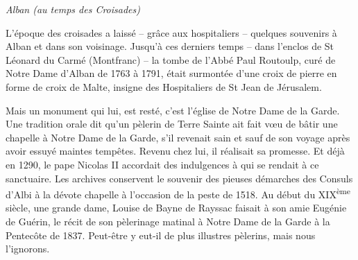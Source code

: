 

\begin{center}
  {\Large\itshape Alban (au temps des Croisades)}
\end{center}

\vspace{1em}

L'époque des croisades a laissé -- grâce aux hospitaliers -- quelques souvenirs à Alban et dans son voisinage. Jusqu'à ces derniers temps -- dans l'enclos de St Léonard du Carmé (Montfranc) -- la tombe de l'Abbé Paul Routoulp, curé de Notre Dame d'Alban de 1763 à 1791, était surmontée d'une croix de pierre en forme de croix de Malte, insigne des Hospitaliers de St Jean de Jérusalem.

Mais un monument qui lui, est resté, c'est l'église de Notre Dame de la Garde. Une tradition orale dit qu'un pèlerin de Terre Sainte ait fait vœu de bâtir une chapelle à Notre Dame de la Garde, s'il revenait sain et sauf de son voyage après avoir essuyé maintes tempêtes. Revenu chez lui, il réalisait sa promesse. Et déjà en 1290, le pape Nicolas II accordait des indulgences à qui se rendait à ce sanctuaire. Les archives conservent le souvenir des pieuses démarches des Consuls d'Albi à la dévote chapelle à l'occasion de la peste de 1518. Au début du XIX\textsuperscript{ème} siècle, une grande dame, Louise de Bayne de Rayssac faisait à son amie Eugénie de Guérin, le récit de son pèlerinage matinal à Notre Dame de la Garde à la Pentecôte de 1837. Peut-être y eut-il de plus illustres pèlerins, mais nous l'ignorons.

